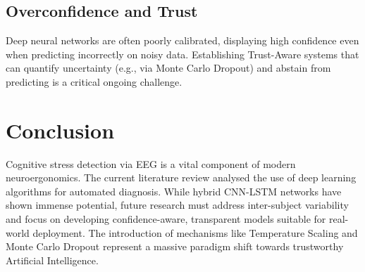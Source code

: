 \documentclass[12pt, a4paper]{article}
\begin{document}
\subsection{Overconfidence and Trust}
Deep neural networks are often poorly calibrated, displaying high confidence even when predicting incorrectly on noisy data. Establishing Trust-Aware systems that can quantify uncertainty (e.g., via Monte Carlo Dropout) and abstain from predicting is a critical ongoing challenge.

\section{Conclusion}
Cognitive stress detection via EEG is a vital component of modern neuroergonomics. The current literature review analysed the use of deep learning algorithms for automated diagnosis. While hybrid CNN-LSTM networks have shown immense potential, future research must address inter-subject variability and focus on developing confidence-aware, transparent models suitable for real-world deployment. The introduction of mechanisms like Temperature Scaling and Monte Carlo Dropout represent a massive paradigm shift towards trustworthy Artificial Intelligence.
\end{document}
